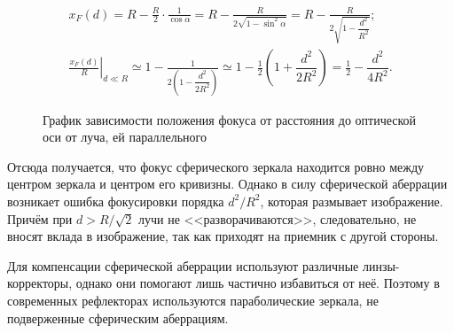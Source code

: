 \begin{gather*}
    x_F(d) = R - \frac{R}{2} \cdot \frac{1}{\cos\alpha} = R - \frac{R}{2\sqrt{1 - \sin^2 \alpha}}  = R  - \frac{R}{2\sqrt{1 - \dfrac{d^2}{R^2}}};\\
    \left. \frac{x_F(d)}{R} \right|_{d \ll R} \simeq  1  - \frac{1}{2\left(1 - \dfrac{d^2}{2R^2} \right)} \simeq  1 - \frac{1}{2}\left(1 + \dfrac{d^2}{2R^2} \right)  = \frac{1}{2} -  \dfrac{d^2}{4R^2}.
\end{gather*}
\begin{wrapfigure}[12]{r}{0.55\tw}
    \centering
    \vspace{-.5pc}
    \caption{График зависимости положения фокуса от расстояния до оптической оси от луча, ей параллельного}
\end{wrapfigure}
Отсюда получается, что фокус сферического зеркала находится ровно между центром зеркала и центром его кривизны. Однако в силу сферической аберрации возникает ошибка фокусировки порядка $d^2/R^2$, которая размывает изображение. Причём при $d > R/\sqrt{2}$ лучи не <<разворачиваются>>, следовательно, не вносят вклада в изображение, так как приходят на приемник с другой стороны.

Для компенсации сферической аберрации используют различные линзы-коррек\-торы, однако они помогают лишь частично избавиться от неё. Поэтому в современных рефлекторах используются параболические зеркала, не подверженные сферическим аберрациям.

